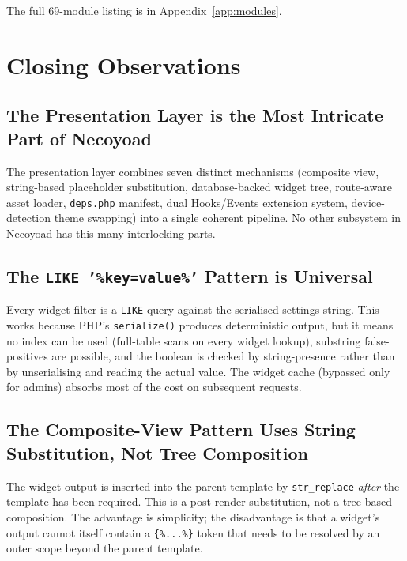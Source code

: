 \documentclass[11pt,a4paper]{article}
\begin{document}
The full 69-module listing is in Appendix~\ref{app:modules}.

\section{Closing Observations}\label{sec:observations}

\subsection{The Presentation Layer is the Most Intricate Part of Necoyoad}

The presentation layer combines seven distinct mechanisms
(composite view, string-based placeholder substitution,
database-backed widget tree, route-aware asset loader,
\texttt{deps.php} manifest, dual Hooks/Events extension system,
device-detection theme swapping) into a single coherent pipeline.
No other subsystem in Necoyoad has this many interlocking parts.

\subsection{The \texttt{LIKE '\%key=value\%'} Pattern is Universal}

Every widget filter is a \texttt{LIKE} query against the serialised
settings string. This works because PHP's \texttt{serialize()}
produces deterministic output, but it means no index can be used
(full-table scans on every widget lookup), substring
false-positives are possible, and the boolean is checked by
string-presence rather than by unserialising and reading the
actual value. The widget cache (bypassed only for admins) absorbs
most of the cost on subsequent requests.

\subsection{The Composite-View Pattern Uses String Substitution, Not Tree Composition}

The widget output is inserted into the parent template by
\texttt{str\_replace} \emph{after} the template has been required.
This is a post-render substitution, not a tree-based composition.
The advantage is simplicity; the disadvantage is that a widget's
output cannot itself contain a \texttt{\{\%...\%\}} token that
needs to be resolved by an outer scope beyond the parent template.
\end{document}

